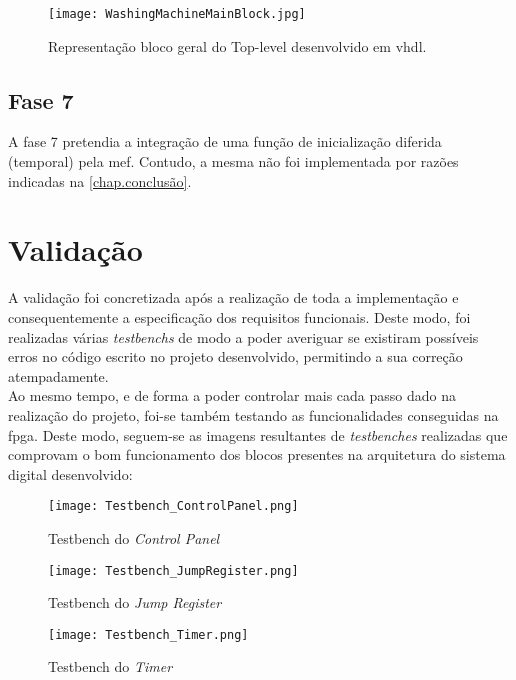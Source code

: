 \begin{figure}[H]
	\centering
	\texttt{[image: WashingMachineMainBlock.jpg]}
	\caption{Representação bloco geral do Top-level desenvolvido em \ac{vhdl}. \\}
	\label{fig:top_level}
\end{figure} 


\section{Fase 7}
\label{sec.fase7}

A fase 7 pretendia a integração de uma função de inicialização diferida (temporal) pela \ac{mef}. Contudo, a mesma não foi implementada por razões indicadas na \autoref{chap.conclusão}.


\chapter{Validação}	
\label{chap.validação}

A validação foi concretizada após a realização de toda a implementação e consequentemente a especificação dos requisitos funcionais. Deste modo, foi realizadas várias \emph{testbenchs} de modo a poder averiguar se existiram possíveis erros no código escrito no projeto desenvolvido, permitindo a sua correção atempadamente. \\ 
Ao mesmo tempo, e de forma a poder controlar mais cada passo dado na realização do projeto, foi-se também testando as funcionalidades conseguidas na \ac{fpga}.
Deste modo, seguem-se as imagens resultantes de \textit{testbenches} realizadas que comprovam o bom  funcionamento dos blocos presentes na arquitetura do sistema digital desenvolvido:

\begin{figure} [H]
\centering
\texttt{[image: Testbench\_ControlPanel.png]}
\caption{Testbench do \textit{Control Panel}}
\label{fig:test_controlPanel}
\end{figure}

\begin{figure} [H]
\centering
\texttt{[image: Testbench\_JumpRegister.png]}
\caption{Testbench do \textit{Jump Register}}
\label{fig:test_controlPanel}
\end{figure}

\begin{figure} [H]
\centering
\texttt{[image: Testbench\_Timer.png]}
\caption{Testbench do \textit{Timer}}
\label{fig:test_controlPanel}
\end{figure}


